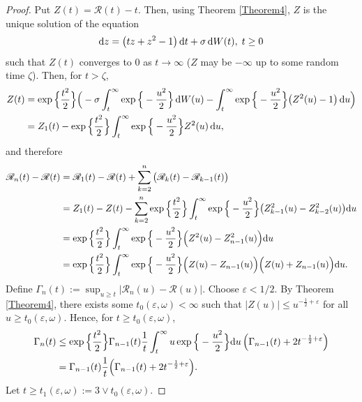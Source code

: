 \documentclass[sn-mathphys-num]{sn-jnl}
\theoremstyle{definition}
\newcommand{\scr}[1]{\mathscr #1}
\numberwithin{equation}{section} \theoremstyle{remark}
\renewcommand{\d}{\hbox{d}}
\def\d{\text{\rm{d}}} \def\bb{\beta} \def\aa{\alpha} \def\D{\scr D}
\def\RR{\mathscr R}
\newcommand{\1}{\mathbbm{1}}
\begin{document}
   \begin{proof}
Put $Z(t)=\RR (t)-t$. Then, using Theorem \ref{Theorem4}, $Z$ is the unique solution of the equation
     $$
\d z= \big(tz+z^2-1\big)\,\d t+\sigma\,\d W(t),\;t \geq 0
$$
such that $Z(t)$ converges to 0 as $t\to \infty$ ($Z$ may be $-\infty$ up to some random time $\zeta$). Then, for $t > \zeta$,
\begin{align*}
Z(t)%
                 &=\exp\Big\{\frac{t^2}2 \Big\} \Big( -\sigma \int_t^\infty \exp\Big\{-\frac{u^2}2 \Big\}\,\d W(u)-\int_t^\infty  \exp\Big\{-\frac{u^2}2 \Big\}\big(Z^2(u)-1\big)\,\d u     \Big)\\
  &=Z_1(t)-\exp\Big\{\frac{t^2}2 \Big\}  \int_t^\infty  \exp\Big\{-\frac{u^2}2 \Big\}Z^2(u)\,\d u,   
\end{align*}
and therefore
\begin{align*}
  \RR_n(t)-\scr{R}(t)& = \RR_1(t)-\RR(t)+\sum_{k=2}^n\big(\RR_k(t)-\RR_{k-1}(t)\big)\\
&=Z_1(t)-Z(t)-\sum_{k=2}^n \exp\Big\{\frac{t^2}2 \Big\} \int_t^\infty \exp\Big\{-\frac{u^2}2\Big\}\big(Z_{k-1}^2(u)-Z_{k-2}^2(u)\big)\d u\\
                     &=\exp\Big\{\frac{t^2}2 \Big\}  \int_t^\infty  \exp\Big\{-\frac{u^2}2\Big\} \Big( Z^2(u)-Z_{n-1}^2(u)\Big)\d u\\
  &=\exp\Big\{\frac{t^2}2 \Big\}  \int_t^\infty  \exp\Big\{-\frac{u^2}2\Big\} \Big( Z(u)-Z_{n-1}(u)\Big)\Big(Z(u)+Z_{n-1}(u)\Big)\d u.
\end{align*}
Define $\Gamma_n(t):=\sup_{u\geq t}\big| \RR_n(u)-\scr{R}(u)
\big|$. Choose $\varepsilon < 1/2$. By Theorem \ref{Theorem4}, there
exists some $t_0(\varepsilon,\omega)<\infty$ such that
$|Z(u)|\leq u^{-\frac12+\varepsilon}$ for all
$u \geq t_0(\varepsilon,\omega)$. Hence, for
$t \geq t_0(\varepsilon,\omega)$,
\begin{align*}
  \Gamma_n(t)&\leq \exp\Big\{\frac{t^2}2 \Big\}  \Gamma_{n-1}(t)\frac 1t \int_t^\infty u  \exp\Big\{-\frac{u^2}2\Big\}\d u\, \Big( \Gamma_{n-1}(t)+2t^{-\frac 12 +\varepsilon}\Big)\\
             &=\Gamma_{n-1}(t) \frac 1t  \Big(\Gamma_{n-1}(t)+2t^{-\frac 12 +\varepsilon}\Big).
\end{align*}
Let $t \geq t_1(\varepsilon,\omega):= 3\vee t_0(\varepsilon,\omega)$.

\end{proof}
\end{document}
